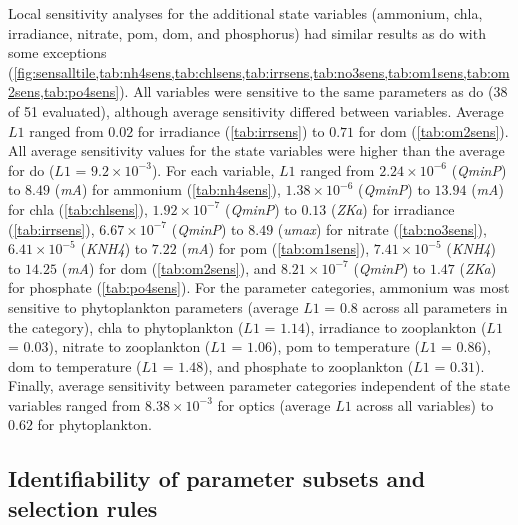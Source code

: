 \documentclass[preprint]{elsarticle}\usepackage[]{graphicx}\usepackage[]{color}
\begin{document}
Local sensitivity analyses for the additional state variables (ammonium, \ac{chla}, irradiance, nitrate, \ac{pom}, \ac{dom}, and phosphorus) had similar results as \ac{do} with some exceptions (\cref{fig:sensalltile,tab:nh4sens,tab:chlsens,tab:irrsens,tab:no3sens,tab:om1sens,tab:om2sens,tab:po4sens}).  All variables were sensitive to the same parameters as \ac{do} (38 of 51 evaluated), although average sensitivity differed between variables.  Average $L1$ ranged from $0.02$ for irradiance (\cref{tab:irrsens}) to $0.71$ for \ac{dom} (\cref{tab:om2sens}).  All average sensitivity values for the state variables were higher than the average for \ac{do} ($L1$ = $9.2\times 10^{-3}$).  For each variable, $L1$ ranged from $2.24\times 10^{-6}$ (\textit{QminP}) to $8.49$ (\textit{mA}) for ammonium (\cref{tab:nh4sens}), $1.38\times 10^{-6}$ (\textit{QminP}) to $13.94$ (\textit{mA}) for \ac{chla} (\cref{tab:chlsens}), $1.92\times 10^{-7}$ (\textit{QminP}) to $0.13$ (\textit{ZKa}) for irradiance (\cref{tab:irrsens}), $6.67\times 10^{-7}$ (\textit{QminP}) to $8.49$ (\textit{umax}) for nitrate (\cref{tab:no3sens}), $6.41\times 10^{-5}$ (\textit{KNH4}) to $7.22$ (\textit{mA}) for \ac{pom} (\cref{tab:om1sens}),  $7.41\times 10^{-5}$ (\textit{KNH4}) to $14.25$ (\textit{mA}) for \ac{dom} (\cref{tab:om2sens}), and $8.21\times 10^{-7}$ (\textit{QminP}) to $1.47$ (\textit{ZKa}) for phosphate (\cref{tab:po4sens}).  For the parameter categories, ammonium was most sensitive to phytoplankton parameters (average $L1$ = $0.8$ across all parameters in the category), \ac{chla} to phytoplankton ($L1$ = $1.14$), irradiance to zooplankton ($L1$ = $0.03$), nitrate to zooplankton ($L1$ = $1.06$), \ac{pom} to temperature ($L1$ = $0.86$), \ac{dom} to temperature ($L1$ = $1.48$), and phosphate to zooplankton ($L1$ = $0.31$).  Finally, average sensitivity between parameter categories independent of the state variables ranged from $8.38\times 10^{-3}$ for optics (average $L1$ across all variables) to $0.62$ for phytoplankton. 

\subsection{Identifiability of parameter subsets and selection rules}
\end{document}
